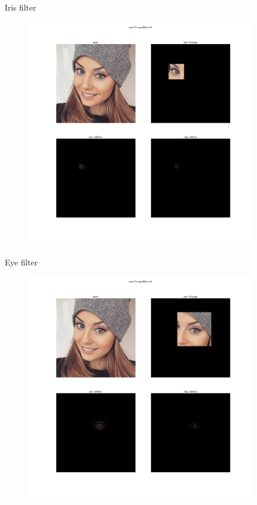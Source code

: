 \documentclass{beamer}
\begin{document}
\begin{frame}{Iris filter}

\begin{figure}[h!]
  \centering
  \includegraphics[width=0.9\textwidth]{images/eye1.png}
\end{figure}

\end{frame}


\begin{frame}{Eye filter}

\begin{figure}[h!]
  \centering
  \includegraphics[width=0.9\textwidth]{images/eye2.png}
\end{figure}

\end{frame}
\end{document}
